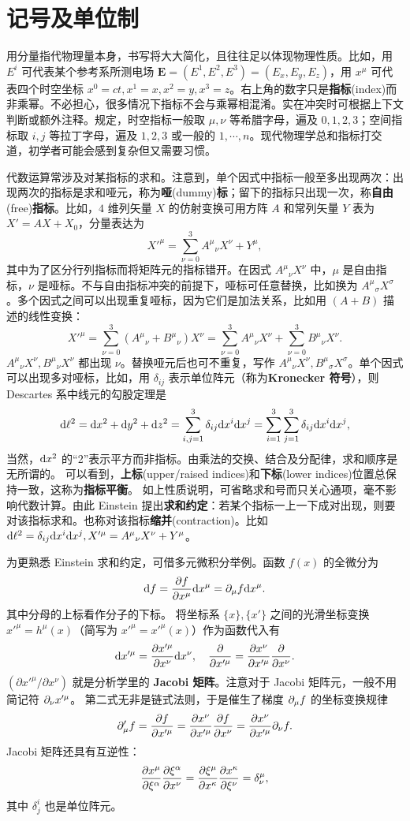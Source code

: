 \chapter*{记号及单位制}



用分量指代物理量本身，书写将大大简化，且往往足以体现物理性质。比如，用 $E^i$ 可代表某个参考系所测电场 $\bm E=(E^1,E^2,E^3)=(E_x,E_y,E_z)$，用 $x^\mu$ 可代表四个时空坐标 $x^0=ct,x^1=x,x^2=y,x^3=z$。右上角的数字只是\textbf{指标}(index)而非乘幂。不必担心，很多情况下指标不会与乘幂相混淆。实在冲突时可根据上下文判断或额外注释。规定，时空指标一般取 $\mu,\nu$ 等希腊字母，遍及 $0,1,2,3$；空间指标取 $i,j$ 等拉丁字母，遍及 $1,2,3$ 或一般的 $1,\cdots,n$。现代物理学总和指标打交道，初学者可能会感到复杂但又需要习惯。

代数运算常涉及对某指标的求和。注意到，单个因式中指标一般至多出现两次：出现两次的指标是求和哑元，称为\textbf{哑}(dummy)\textbf{标}；留下的指标只出现一次，称\textbf{自由}(free)\textbf{指标}。比如，$4$ 维列矢量 $X$ 的仿射变换可用方阵 $A$ 和常列矢量 $Y$ 表为 $X'=AX+X_0$，分量表达为
\[X'^\mu=\sum_{\nu=0}^3 A^{\mu}{}_{\nu}X^\nu+ Y^\mu,\]
其中为了区分行列指标而将矩阵元的指标错开。在因式 $A^{\mu}{}_{\nu}X^\nu$ 中，$\mu$ 是自由指标，$\nu$ 是哑标。不与自由指标冲突的前提下，哑标可任意替换，比如换为 $A^{\mu}{}_{\sigma}X^\sigma$。多个因式之间可以出现重复哑标，因为它们是加法关系，比如用 $(A+B)$ 描述的线性变换：
\[X'^\mu=\sum_{\nu=0}^3 (A^{\mu}{}_{\nu}+B^{\mu}{}_{\nu})X^\nu=\sum_{\nu=0}^3 A^{\mu}{}_{\nu}X^\nu+\sum_{\nu=0}^3 B^{\mu}{}_{\nu}X^\nu.\]
$A^{\mu}{}_{\nu}X^\nu,B^{\mu}{}_{\nu}X^\nu$ 都出现 $\nu$。替换哑元后也可不重复，写作 $A^{\mu}{}_{\nu}X^\nu,B^{\mu}{}_{\sigma}X^\sigma$。单个因式可以出现多对哑标，比如，用 $\delta_{ij}$ 表示单位阵元（称为\textbf{Kronecker 符号}），则 Descartes 系中线元的勾股定理是
\[\dd\ell^2=\dd x^2+\dd y^2+\dd z^2=\sum_{i,j=1}^3\delta_{ij}\dd x^i\dd x^j=\sum_{i=1}^3\sum_{j=1}^3\delta_{ij}\dd x^i\dd x^j,\]
当然，$\dd x^2$ 的“2”表示平方而非指标。由乘法的交换、结合及分配律，求和顺序是无所谓的。
可以看到，\textbf{上标}(upper/raised indices)和\textbf{下标}(lower indices)位置总保持一致，这称为\textbf{指标平衡}。
如上性质说明，可省略求和号而只关心通项，毫不影响代数计算。由此 Einstein 提出\textbf{求和约定}：若某个指标一上一下成对出现，则要对该指标求和。也称对该指标\textbf{缩并}(contraction)。比如 $\dd\ell^2=\delta_{ij}\dd x^i\dd x^j,X'^\mu=A^{\mu}{}_{\nu}X^\nu+ Y^\mu$。

为更熟悉 Einstein 求和约定，可借多元微积分举例。函数 $f(x)$ 的全微分为
\[
    \dd f=\pdv{f}{x^\mu}\dd x^\mu=\partial_\mu f\dd x^\mu.
\]
其中分母的上标看作分子的下标。
将坐标系 $\{x\},\{x'\}$ 之间的光滑坐标变换 $x'^\mu=h^\mu(x)$（简写为 $x'^\mu=x'^\mu(x)$）作为函数代入有
\[
    \dd x'^\mu=\pdv{x'^\mu}{x^\nu}\dd x^\nu,\quad \pdv{x'^\mu} =\pdv{x^\nu}{x'^\mu} \pdv{x^\nu}. 
\]
$({\partial x'^\mu}/{\partial x^\nu})$ 就是分析学里的 \textbf{Jacobi 矩阵}。注意对于 Jacobi 矩阵元，一般不用简记符 $\partial_\nu x'^\mu$。
第二式无非是链式法则，于是催生了梯度 $\partial_\mu f$ 的坐标变换规律
\[
    \partial'_\mu f=\pdv{f}{x'^\mu}=\pdv{x^\nu}{x'^\mu}\pdv{f}{x^\nu}=\pdv{x^\nu}{x'^\mu}\partial_\nu f.
\]
Jacobi 矩阵还具有互逆性：
\[\pdv{x^\mu}{\xi^\alpha}\pdv{\xi^\alpha}{x^\nu}=\pdv{\xi^\mu}{x^\kappa} \pdv{x^\kappa}{\xi^\nu}=\delta^\mu_\nu,\]
其中 $\delta^i_j$ 也是单位阵元。

